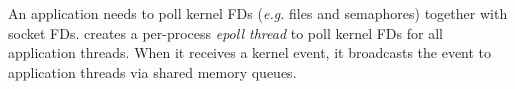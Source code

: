 An application needs to poll kernel FDs (\textit{e.g.} files and semaphores) together with socket FDs.
\libipc{} creates a per-process \textit{epoll thread} to poll kernel FDs for all application threads. When it receives a kernel event, it broadcasts the event to application threads via shared memory queues.%


